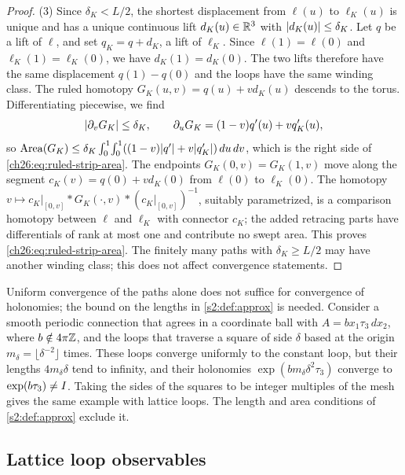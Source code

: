 \begin{proof}
(3) Since $\delta_K<L/2$, the shortest displacement from $\ell(u)$ to $\ell_K(u)$ is unique and has a unique continuous lift $d_K(u)\in\mathbb R^3$ with $\lvert d_K(u)\rvert\le\delta_K$. Let $q$ be a lift of $\ell$, and set $q_K=q+d_K$, a lift of $\ell_K$. Since $\ell(1)=\ell(0)$ and $\ell_K(1)=\ell_K(0)$, we have $d_K(1)=d_K(0)$. The two lifts therefore have the same displacement $q(1)-q(0)$ and the loops have the same winding class. The ruled homotopy $G_K(u,v)=q(u)+vd_K(u)$ descends to the torus. Differentiating piecewise, we find
\[
 \lvert \partial_vG_K\rvert\le\delta_K,\qquad \partial_uG_K=(1-v)q'(u)+vq_K'(u),
\]
so $\operatorname{Area}(G_K)\le\delta_K\int_0^1\!\int_0^1((1-v)\lvert q'\rvert+v\lvert q_K'\rvert)\,du\,dv$, which is the right side of \eqref{ch26:eq:ruled-strip-area}. The endpoints $G_K(0,v)=G_K(1,v)$ move along the segment $c_K(v)=q(0)+vd_K(0)$ from $\ell(0)$ to $\ell_K(0)$. The homotopy $v\mapsto c_K|_{[0,v]}*G_K(\cdot,v)*(c_K|_{[0,v]})^{-1}$, suitably parametrized, is a comparison homotopy between $\ell$ and $\ell_K$ with connector $c_K$; the added retracing parts have differentials of rank at most one and contribute no swept area. This proves \eqref{ch26:eq:ruled-strip-area}. The finitely many paths with $\delta_K\ge L/2$ may have another winding class; this does not affect convergence statements.
\end{proof}

\begin{remark}\label{ch26:rem:length-needed}
Uniform convergence of the paths alone does not suffice for convergence of holonomies; the bound on the lengths in \cref{s2:def:approx} is needed. Consider a smooth periodic connection that agrees in a coordinate ball with $A=bx_1\tau_3\,dx_2$, where $b\notin4\pi\mathbb Z$, and the loops that traverse a square of side $\delta$ based at the origin $m_\delta=\lfloor\delta^{-2}\rfloor$ times. These loops converge uniformly to the constant loop, but their lengths $4m_\delta\delta$ tend to infinity, and their holonomies $\exp(bm_\delta\delta^2\tau_3)$ converge to $\exp(b\tau_3)\ne I$. Taking the sides of the squares to be integer multiples of the mesh gives the same example with lattice loops. The length and area conditions of \cref{s2:def:approx} exclude it.
\end{remark}

\subsection{Lattice loop observables}

